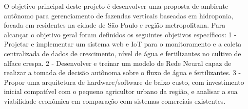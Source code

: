 O objetivo principal deste projeto é desenvolver uma proposta de ambiente autônomo para gerenciamento de fazendas verticais baseadas em hidroponia, focada em residentes na cidade de São Paulo e região metropolitana. Para alcançar o objetivo geral foram definidos os seguintes objetivos específicos:
1 - Projetar e implementar um sistema web e IoT para o monitoramento e a coleta centralizada de dados de crescimento, nível de água e fertilizantes no cultivo de alface crespa.
2 - Desenvolver e treinar um modelo de Rede Neural capaz de realizar a tomada de decisão autônoma sobre o fluxo de água e fertilizantes.
3 - Propor uma arquitetura de hardware/software de baixo custo, com investimento inicial compatível com o pequeno agricultor urbano da região, e analisar a sua viabilidade econômica em comparação com sistemas comerciais existentes.
